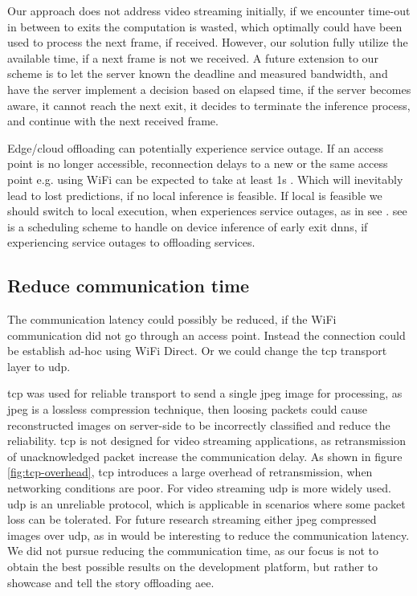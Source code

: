 Our approach does not address video streaming initially, if we encounter time-out in between to exits the computation is wasted, which optimally could have been used to process the next frame, if received. However, our solution fully utilize the available time, if a next frame is not we received. A future extension to our scheme is to let the server known the deadline and measured bandwidth, and have the server implement a decision based on elapsed time, if the server becomes aware, it cannot reach the next exit, it decides to terminate the inference process, and continue with the next received frame.

Edge/cloud offloading can potentially experience service outage. If an access point is no longer accessible, reconnection delays to a new or the same access point e.g. using WiFi can be expected to take at least 1s \cite{pei_why_2017}. Which will inevitably lead to lost predictions, if no local inference is feasible. If local is feasible we should switch to local execution, when experiences service outages, as in \gls{see} \cite{wang_see:_2019}. \gls{see} is a scheduling scheme to handle on device inference of early exit \gls{dnn}s, if experiencing service outages to offloading services.

\subsection*{Reduce communication time}

The communication latency could possibly be reduced, if the WiFi communication did not go through an access point. Instead the connection could be establish ad-hoc using WiFi Direct. Or we could change the \gls{tcp} transport layer to \gls{udp}.

\gls{tcp} was used for reliable transport to send a single jpeg image for processing, as jpeg is a lossless compression technique, then loosing packets could cause reconstructed images on server-side to be incorrectly classified and reduce the reliability. \gls{tcp} is not designed for video streaming applications, as retransmission of unacknowledged packet increase the communication delay. As shown in figure \ref{fig:tcp-overhead}, \gls{tcp} introduces a large overhead of retransmission, when networking conditions are poor. For video streaming \gls{udp} is more widely used. \gls{udp} is an unreliable protocol, which is applicable in scenarios where some packet loss can be tolerated. For future research streaming either jpeg compressed images over \gls{udp}, as in \cite{liu_maximizing_2019} would be interesting to reduce the communication latency. We did not pursue reducing the communication time, as our focus is not to obtain the best possible results on the development platform, but rather to showcase and tell the story offloading \gls{aee}.

